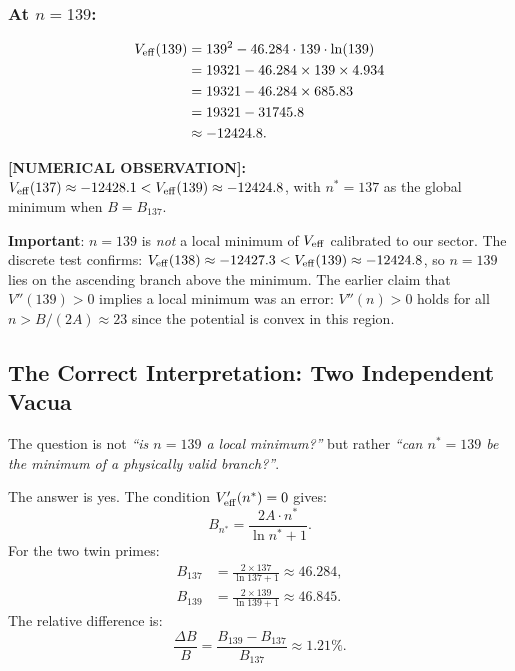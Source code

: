 \documentclass[12pt]{article}
\theoremstyle{definition}
\theoremstyle{remark}
\begin{document}
\subsubsection{At $n = 139$:}
\begin{align}
  V_{\rm eff}(139) &= 139^2 - 46.284 \cdot 139 \cdot \ln(139) \notag\\
  &= 19321 - 46.284 \times 139 \times 4.934 \notag\\
  &= 19321 - 46.284 \times 685.83 \notag\\
  &= 19321 - 31745.8 \notag\\
  &\approx -12424.8.
  \label{eq:Veff139}
\end{align}

\begin{resultbox}
\textbf{[NUMERICAL OBSERVATION]:}
$V_{\rm eff}(137) \approx -12428.1 < V_{\rm eff}(139) \approx -12424.8$,
with $n^* = 137$ as the global minimum when $B = B_{137}$.

\medskip
\textbf{Important}: $n = 139$ is \emph{not} a local minimum of $V_{\rm eff}$
calibrated to our sector.  The discrete test confirms:
$V_{\rm eff}(138) \approx -12427.3 < V_{\rm eff}(139) \approx -12424.8$,
so $n=139$ lies on the ascending branch above the minimum.  The earlier
claim that $V''(139) > 0$ implies a local minimum was an error:
$V''(n) > 0$ holds for all $n > B/(2A) \approx 23$ since the potential
is convex in this region.
\end{resultbox}

\subsection{The Correct Interpretation: Two Independent Vacua}

The question is not \emph{``is $n=139$ a local minimum?''} but rather
\emph{``can $n^*=139$ be the minimum of a physically valid branch?''}.

The answer is yes.  The condition $V'_{\rm eff}(n^*) = 0$ gives:
\begin{equation}
  B_{n^*} = \frac{2A \cdot n^*}{\ln n^* + 1}.
\end{equation}
For the two twin primes:
\begin{align}
  B_{137} &= \frac{2 \times 137}{\ln 137 + 1} \approx 46.284, \\
  B_{139} &= \frac{2 \times 139}{\ln 139 + 1} \approx 46.845.
\end{align}
The relative difference is:
\begin{equation}
  \frac{\Delta B}{B} = \frac{B_{139} - B_{137}}{B_{137}} \approx 1.21\%.
\end{equation}
\end{document}
